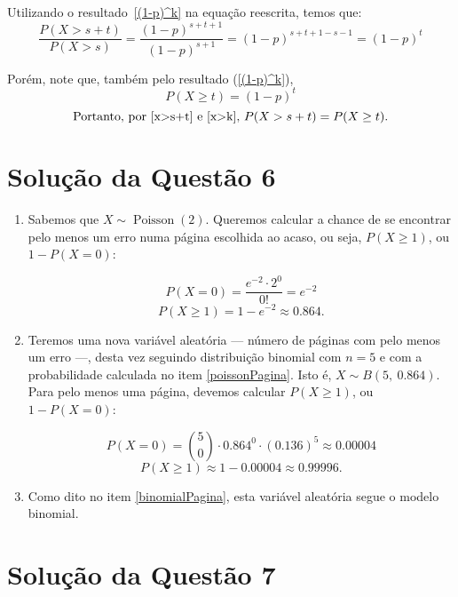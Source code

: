\documentclass[
	12pt,				%
	openright,			%
	oneside,			%
	a4paper,			%
	english,			%
	brazil,				%
	]{abntex2}
\begin{document}
Utilizando o resultado~\eqref{(1-p)^k} na equação reescrita, temos que:
\[\frac{P(X > s + t)}{P(X > s)} = \frac{(1 - p)^{s + t + 1}}{(1 - p)^{s + 1}} = (1 - p)^{s + t + 1 - s - 1} = (1 - p)^t \tag{2} \label{x>s+t}\]
    
Porém, note que, também pelo resultado (\ref{(1-p)^k}), 
\[P(X \geq t) = (1 - p)^t \tag{3} \label{x>k}\]
\[\text{Portanto, por~\eqref{x>s+t} e \eqref{x>k}, } P(X > s + t) = P(X \geq t).\]

\section{Solução da Questão 6}


\begin{enumerate}[label=\alph*)]
    \item Sabemos que $X \sim \operatorname{Poisson}(2)$. Queremos calcular a chance de se encontrar pelo menos um erro numa página escolhida ao acaso, ou seja, $P(X \geq 1)$, ou $1 - P(X = 0)$: \label{poissonPagina}
    
    $$P(X = 0) = \frac{e^{-2}\cdot 2^0}{0!} = e^{-2}$$
    $$P(X \geq 1) = 1 - e^{-2} \approx 0.864.$$
    
    \item Teremos uma nova variável aleatória --- número de páginas com pelo menos um erro ---, desta vez seguindo distribuição binomial com $n = 5$ e com a probabilidade calculada no item \ref{poissonPagina}. Isto é, $X \sim B(5,\ 0.864)$. Para pelo menos uma página, devemos calcular $P(X \geq 1)$, ou $1 - P(X = 0)$: \label{binomialPagina}
    
    $$P(X = 0) = \binom{5}{0} \cdot 0.864^0 \cdot (0.136)^5 \approx 0.00004$$
    $$P(X \geq 1) \approx 1 - 0.00004 \approx 0.99996.$$
    
    \item Como dito no item \ref{binomialPagina}, esta variável aleatória segue o modelo binomial.
\end{enumerate}


\section{Solução da Questão 7}
\end{document}
